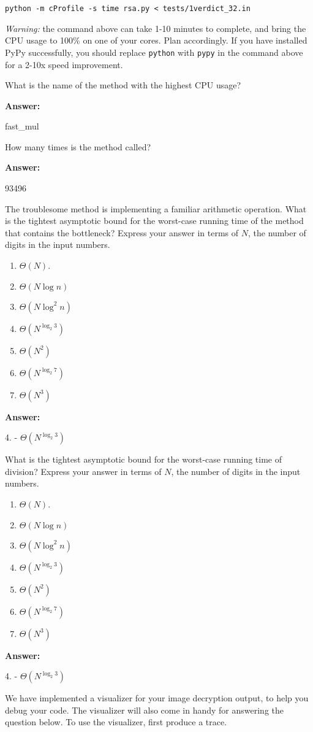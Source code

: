 \documentclass[12pt,twoside]{article}
\newcommand{\answer}{
 \par\medskip
 \textbf{Answer:}
}
\newcommand{\answerIIIa}{ \answer 
fast\_mul
}
\newcommand{\answerIIIb}{ \answer
93496
}
\newcommand{\answerIIIc}{ \answer
4. - $\Theta(N^{\log_2 3})$
}
\newcommand{\answerIIId}{ \answer
4. - $\Theta(N^{\log_2 3})$
}
\begin{document}
\begin{problems}
\begin{problemparts}
\texttt{python -m cProfile -s time rsa.py < tests/1verdict\_32.in}

\textit{Warning:} the command above can take 1-10 minutes to complete, and
bring the CPU usage to 100\% on one of your cores. Plan accordingly. If
you have installed PyPy successfully, you should replace \texttt{python} with
\texttt{pypy} in the command above for a 2-10x speed improvement. 

What is the name of the method with the highest CPU usage?
\answerIIIa

\problempart {} How many times is the method called?
\answerIIIb

\problempart {} The troublesome method is implementing a familiar
arithmetic operation. What is the tightest asymptotic bound for the worst-case
running time of the method that contains the bottleneck? Express your answer in
terms of $N$, the number of digits in the input numbers.
\begin{enumerate}
  \item $\Theta(N)$.
  \item $\Theta(N \log n)$
  \item $\Theta(N \log^2 n)$
  \item $\Theta(N^{\log_{2} 3})$
  \item $\Theta(N^2)$
  \item $\Theta(N^{\log_{2} 7})$
  \item $\Theta(N^3)$
\end{enumerate}
\answerIIIc

\problempart {} What is the tightest asymptotic bound for the worst-case
running time of division? Express your answer in terms of $N$, the number of
digits in the input numbers.
\begin{enumerate}
  \item $\Theta(N)$.
  \item $\Theta(N \log n)$
  \item $\Theta(N \log^2 n)$
  \item $\Theta(N^{\log_{2} 3})$
  \item $\Theta(N^2)$
  \item $\Theta(N^{\log_{2} 7})$
  \item $\Theta(N^3)$
\end{enumerate}
\answerIIId

\end{problemparts}

We have implemented a visualizer for your image decryption output, to help you
debug your code. The visualizer will also come in handy for answering the
question below. To use the visualizer, first produce a trace.


\end{problems}
\end{document}
